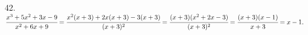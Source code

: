 42. $\cfrac{x^3+5x^2+3x-9}{x^2+6x+9}=\cfrac{x^2(x+3)+2x(x+3)-3(x+3)}{(x+3)^2}=\cfrac{(x+3)(x^2+2x-3)}{(x+3)^2}=\cfrac{(x+3)(x-1)}{x+3}=x-1.$\\
